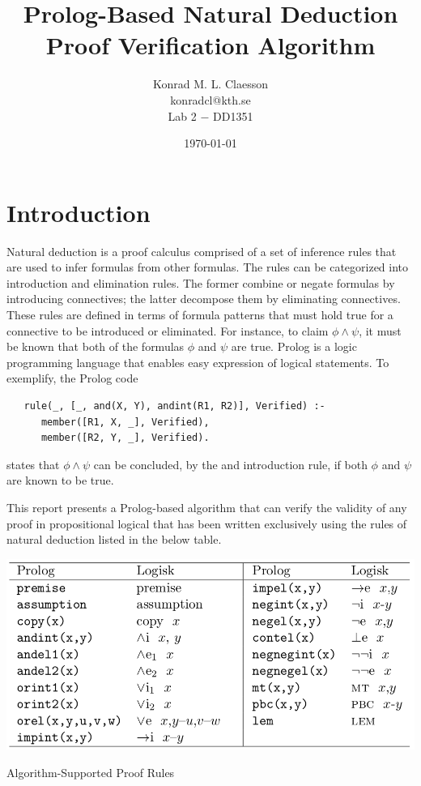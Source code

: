 \documentclass[a4paper, 11pt]{article}
\title{Prolog-Based Natural Deduction Proof Verification
Algorithm}
\author
{
   Konrad M. L. Claesson \\
   konradcl@kth.se \\
   Lab 2 $-$ DD1351
}
\date{\today}
\begin{document}
   \maketitle
   \thispagestyle{empty}   %
   
   \clearpage
   \newpage

   \tableofcontents
   \newpage

   \section{Introduction}
   Natural deduction is a proof calculus comprised of a set of
   inference rules that are used to infer formulas from other
   formulas. The rules can be categorized into introduction
   and elimination rules. The former combine or negate
   formulas by introducing connectives; the latter decompose
   them by eliminating connectives. These rules are defined in
   terms of formula patterns that must hold true for a 
   connective to be introduced or eliminated. For instance, to
   claim $\phi \wedge \psi$, it must be known that
   both of the formulas $\phi$ and $\psi$ are true. Prolog is
   a logic programming language that enables easy expression 
   of logical statements. To exemplify, the Prolog code
   
\begin{verbatim}
   rule(_, [_, and(X, Y), andint(R1, R2)], Verified) :-
      member([R1, X, _], Verified),
      member([R2, Y, _], Verified).
\end{verbatim}
   
   states that $\phi \wedge \psi$ can be concluded, by the and
   introduction rule, if both $\phi$ and $\psi$ are known to
   be true. 
   \bigbreak

   This report presents a Prolog-based algorithm that can
   verify the validity of any proof in propositional logical 
   that has been written exclusively using the rules of
   natural deduction listed in the below table.

   \begin{table}[h]
      \centering
      \includegraphics[scale=0.325]{inference-rules}
      \caption{Algorithm-Supported Proof Rules}
      \label{algorithm-supported-proof-rules}
   \end{table}
\end{document}
